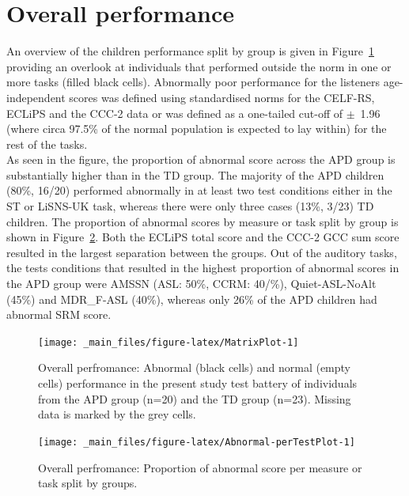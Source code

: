 \documentclass[a4paper, twoside]{templates/ociamthesis}
\begin{document}
\hypertarget{overall-performance}{%
\section{Overall performance}\label{overall-performance}}

An overview of the children performance split by group is given in Figure~\ref{fig:MatrixPlot} providing an overlook at individuals that performed outside the norm in one or more tasks (filled black cells). Abnormally poor performance for the listeners age-independent scores was defined using standardised norms for the CELF-RS, ECLiPS and the CCC-2 data or was defined as a one-tailed cut-off of \(\pm\)~1.96 (where circa 97.5\% of the normal population is expected to lay within) for the rest of the tasks.\\

As seen in the figure, the proportion of abnormal score across the APD group is substantially higher than in the TD group. The majority of the APD children (80\%, 16/20) performed abnormally in at least two test conditions either in the ST or LiSNS-UK task, whereas there were only three cases (13\%, 3/23) TD children. The proportion of abnormal scores by measure or task split by group is shown in Figure~\ref{fig:Abnormal-perTestPlot}. Both the ECLiPS total score and the CCC-2 GCC sum score resulted in the largest separation between the groups. Out of the auditory tasks, the tests conditions that resulted in the highest proportion of abnormal scores in the APD group were AMSSN (ASL: 50\%, CCRM: 40/\%), Quiet-ASL-NoAlt (45\%) and MDR\_F-ASL (40\%), whereas only 26\% of the APD children had abnormal SRM score.\\

\begin{figure}

{\centering \texttt{[image: \_main\_files/figure-latex/MatrixPlot-1]} 

}

\caption{Overall perfromance: Abnormal (black cells) and normal (empty cells) performance in the present study test battery of individuals from the APD group (n=20) and the TD group (n=23). Missing data is marked by the grey cells.}\label{fig:MatrixPlot}
\end{figure}

\begin{figure}

{\centering \texttt{[image: \_main\_files/figure-latex/Abnormal-perTestPlot-1]} 

}

\caption{Overall perfromance: Proportion of abnormal score per measure or task split by groups.}\label{fig:Abnormal-perTestPlot}
\end{figure}
\end{document}
